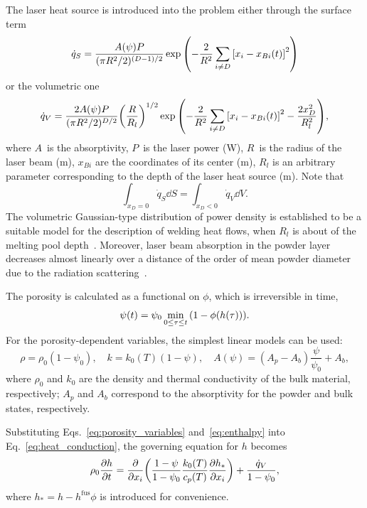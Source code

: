 \documentclass{article}
\newcommand{\fusion}[1]{{#1}^\mathrm{fus}}
\begin{document}
The laser heat source is introduced into the problem either through the surface term
\begin{equation}\label{eq:laser_surface}
    \dot{q}_S = \frac{A(\psi)P}{(\pi R^2/2)^{(D-1)/2}}\exp\qty( -\frac2{R^2}\sum_{i\neq D}\qty[x_i-x_{Bi}(t)]^2 )
\end{equation}
or the volumetric one
\begin{equation}\label{eq:laser_volumetric}
    \dot{q}_V = \frac{2A(\psi)P}{(\pi R^2/2)^{D/2}}\qty(\frac{R}{R_l})^{1/2}
    \exp\qty( -\frac2{R^2}\sum_{i\neq D}\qty[x_i-x_{Bi}(t)]^2 - \frac{2x_D^2}{R_l^2} ),
\end{equation}
where \(A\)~is the absorptivity, \(P\)~is the laser power (\si{W}), \(R\)~is the radius of the laser beam (\si{m}),
\(x_{Bi}\) are the coordinates of its center (\si{m}),
\(R_l\) is an arbitrary parameter corresponding to the depth of the laser heat source (\si{m}).
Note that
\[ \int_{x_D=0} \dot{q}_S \dd{S} = \int_{x_D<0} \dot{q}_V \dd{V}. \]
The volumetric Gaussian-type distribution of power density is established to be a suitable model
for the description of welding heat flows, when \(R_l\) is about of the melting pool depth~\cite{Goldak1984}.
Moreover, laser beam absorption in the powder layer decreases almost linearly
over a distance of the order of mean powder diameter due to the radiation scattering~\cite{Gusarov2009}.

The porosity is calculated as a functional on \(\phi\), which is irreversible in time,
\begin{equation}\label{eq:porosity}
    \psi(t) = \psi_0\min_{0\leq\tau\leq t}\qty( 1-\phi(h(\tau)) ).
\end{equation}
For the porosity-dependent variables, the simplest linear models can be used:
\begin{equation}\label{eq:porosity_variables}
    \rho = \rho_0(1-\psi_0), \quad k = k_0(T)(1-\psi), \quad A(\psi) = (A_p - A_b)\frac{\psi}{\psi_0} + A_b,
\end{equation}
where \(\rho_0\) and \(k_0\) are the density and thermal conductivity of the bulk material, respectively;
\(A_p\) and \(A_b\) correspond to the absorptivity for the powder and bulk states, respectively.

Substituting Eqs.~\eqref{eq:porosity_variables} and~\eqref{eq:enthalpy} into Eq.~\eqref{eq:heat_conduction},
the governing equation for \(h\) becomes
\begin{equation}\label{eq:heat_conduction_star}
    \rho_0\pdv{h}{t} = \pdv{x_i}\qty( \frac{1-\psi}{1-\psi_0} \frac{k_0(T)}{c_p(T)}\pdv{h_*}{x_i} ) + \frac{\dot{q}_V}{1-\psi_0},
\end{equation}
where \(h_* = h - \fusion{h}\phi\) is introduced for convenience.
\end{document}
